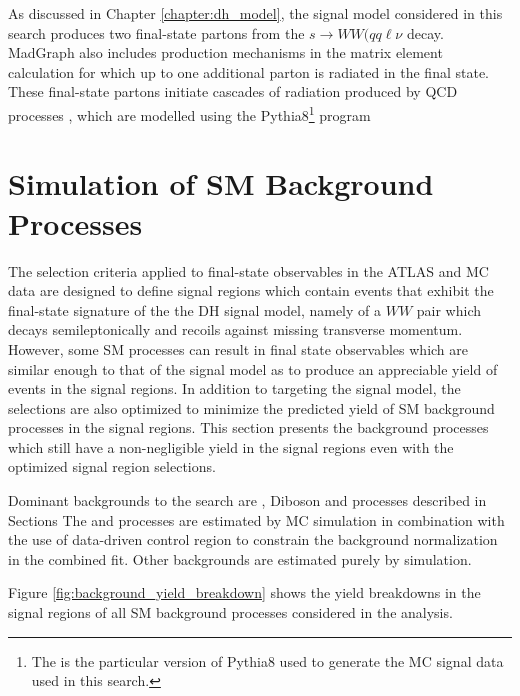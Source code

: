 As discussed in Chapter \ref{chapter:dh_model}, the signal model considered in this search produces two final-state partons from the \(s \rightarrow WW(qq\ell\nu\) decay. MadGraph also includes production mechanisms in the matrix element calculation for which up to one additional parton is radiated in the final state. These final-state partons initiate cascades of radiation produced by QCD processes \cite{parton_shower}, which are modelled using the Pythia8\footnote{The \PYTHIA[8.230]\cite{Sjostrand:2014zea} is the particular version of Pythia8 used to generate the MC signal data used in this search.} program

\section{Simulation of SM Background Processes}
\label{sec:SM_bkg_sim}

The selection criteria applied to final-state observables in the ATLAS and MC data are designed to define signal regions which contain events that exhibit the final-state signature of the the DH signal model, namely of a \(WW\) pair which decays semileptonically and recoils against missing transverse momentum. However, some SM processes can result in final state observables which are similar enough to that of the signal model as to produce an appreciable yield of events in the signal regions. In addition to targeting the signal model, the selections are also optimized to minimize the predicted yield of SM background processes in the signal regions. This section presents the background processes which still have a non-negligible yield in the signal regions even with the optimized signal region selections.

Dominant backgrounds to the search are \wjets, Diboson and \ttbar processes described in Sections 
The \wjets and \ttbar processes are estimated by MC simulation in combination with the use of data-driven control region to constrain the background normalization in the combined fit.
Other backgrounds are estimated purely by simulation.

Figure \ref{fig:background_yield_breakdown} shows the yield breakdowns in the signal regions of all SM background processes considered in the analysis.

